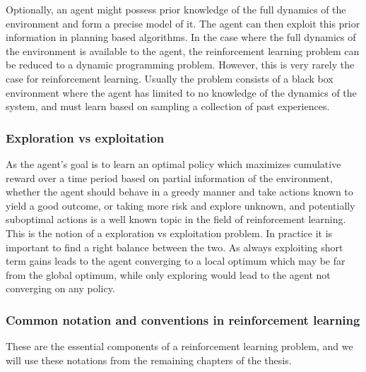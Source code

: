 Optionally, an agent might possess prior knowledge of the full dynamics of the environment and form a precise model of it. The agent can then exploit this prior information in planning based algorithms. In the case where the full dynamics of the environment is available to the agent, the reinforcement learning problem can be reduced to a dynamic programming problem. However, this is very rarely the case for reinforcement learning. Usually the problem consists of a black box environment where the agent has limited to no knowledge of the dynamics of the system, and must learn based on sampling a collection of past experiences. 



\subsubsection{Exploration vs exploitation}

As the agent's goal is to learn an optimal policy which maximizes cumulative reward over a time period based on partial information of the environment, whether the agent should behave in a greedy manner and take actions known to yield a good outcome, or taking more risk and explore unknown, and potentially suboptimal actions is a well known topic in the field of reinforcement learning. This is the notion of a exploration vs exploitation problem. In practice it is important to find a right balance between the two. As always exploiting short term gains leads to the agent converging to a local optimum which may be far from the global optimum, while only exploring would lead to the agent not converging on any policy.

\subsubsection{Common notation and conventions in reinforcement learning}

These are the essential components of a reinforcement learning problem, and we will use these notations from the remaining chapters of the thesis. 

